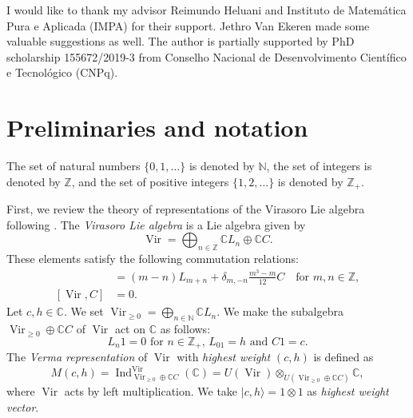\documentclass[a4paper, 12pt, reqno]{amsart}
\theoremstyle{remark}
\DeclareMathOperator{\Vir}{Vir}
\DeclareMathOperator{\Ind}{Ind}
\begin{document}
I would like to thank my advisor Reimundo Heluani and Instituto de Matemática Pura e Aplicada (IMPA) for their support.
Jethro Van Ekeren made some valuable suggestions as well.
The author is partially supported by PhD scholarship 155672/2019-3 from Conselho Nacional de Desenvolvimento Científico e Tecnológico (CNPq).

\section{Preliminaries and notation}
\label{sec:prel-notat}

The set of natural numbers $\{0, 1, \dots\}$ is denoted by $\mathbb{N}$, the set of integers is denoted by $\mathbb{Z}$, and the set of positive integers $\{1, 2, \dots\}$ is denoted by $\mathbb{Z}_+$.

First, we review the theory of representations of the Virasoro Lie algebra following \cite{kac_bombay_2013}.
The \emph{Virasoro Lie algebra} is a Lie algebra given by
\begin{equation*}
  \Vir = \bigoplus_{n \in \mathbb{Z}}\mathbb{C}L_n \oplus \mathbb{C}C.
\end{equation*}
These elements satisfy the following commutation relations:
\begin{align*}
  [L_m, L_n] &= (m - n)L_{m + n} + \delta_{m, -n}\frac{m^3 - m}{12}C \quad \text{for $m, n \in \mathbb{Z}$}, \\
  [\Vir, C] &= 0.
\end{align*}
Let $c, h \in \mathbb{C}$.
We set $\Vir_{\ge 0} = \bigoplus_{n \in \mathbb{N}}\mathbb{C}L_n$.
We make the subalgebra $\Vir_{\ge 0} \oplus \mathbb{C}C$ of $\Vir$ act on $\mathbb{C}$ as follows:
\begin{equation*}
  \text{$L_n1 = 0$ for $n \in \mathbb{Z}_+$, $L_01 = h$ and $C1 = c$}.
\end{equation*}
The \emph{Verma representation} of $\Vir$ with \emph{highest weight} $(c, h)$ is defined as
\begin{equation*}
  M(c, h) = \Ind^{\Vir}_{\Vir_{\ge 0} \oplus \mathbb{C}C}(\mathbb{C}) = U(\Vir) \otimes_{U(\Vir_{\ge 0} \oplus \mathbb{C}C)} \mathbb{C},
\end{equation*}
where $\Vir$ acts by left multiplication.
We take $|c, h\rangle = 1 \otimes 1$ as \emph{highest weight vector}.
\end{document}
